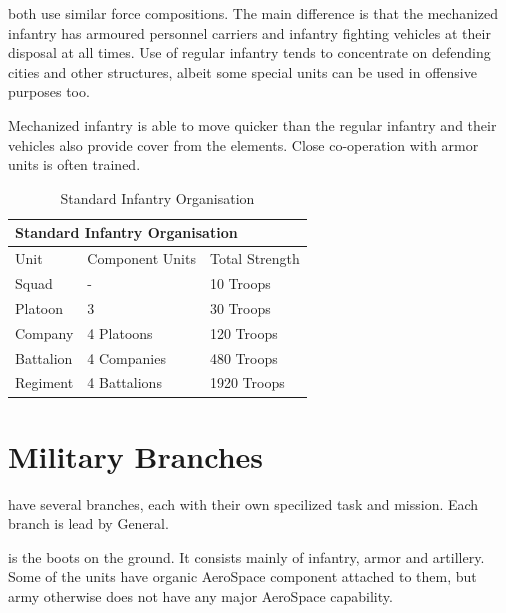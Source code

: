\documentclass{tufte-book}
\begin{document}
 both use similar force
compositions. The main difference is that the mechanized infantry has
armoured personnel carriers and infantry fighting vehicles at their
disposal at all times. Use of regular infantry tends to concentrate on
defending cities and other structures, albeit some special units can be
used in offensive purposes too.

Mechanized infantry is able to move quicker than the regular infantry
and their vehicles also provide cover from the elements. Close
co-operation with armor units is often trained.

\bigskip
\begin{table}
\begin{minipage}{\textwidth}
\begin{center}
\begin{tabular}{lll}
\toprule
\multicolumn{3}{l}{Standard Infantry Organisation} \\
\midrule
Unit & Component Units & Total Strength \\
\midrule
Squad     & -            & 10 Troops \\
Platoon   & 3            & 30 Troops \\
Company   & 4 Platoons   & 120 Troops \\
Battalion & 4 Companies  & 480 Troops \\
Regiment  & 4 Battalions & 1920 Troops \\
\bottomrule
\end{tabular}
\end{center}
\end{minipage}
\caption{Standard Infantry Organisation}
\end{table}

\section{Military Branches}
\label{sc:military_branches}

 have several branches, each with their own
specilized task and mission. Each branch is lead by General.

 is the boots on the ground. It consists mainly of infantry,
armor and artillery. Some of the units have organic AeroSpace component
attached to them, but army otherwise does not have any major AeroSpace
capability.
\end{document}
